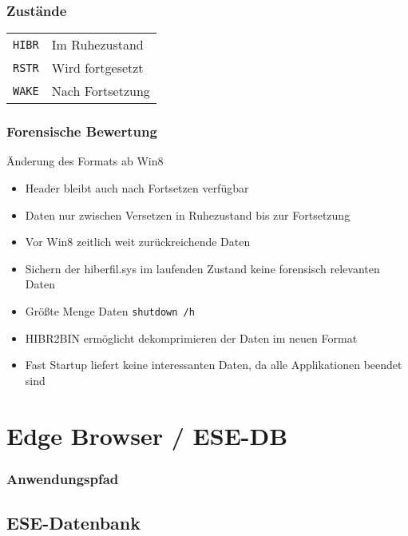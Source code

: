 \begin{multicols}{3}
\subsubsection{Zustände}
\begin{tabular}{@{}p{\the\MyLen}%
		@{}p{\linewidth-\the\MyLen}@{}}
	\texttt{HIBR} & Im Ruhezustand\\
	\texttt{RSTR} & Wird fortgesetzt\\
	\texttt{WAKE} & Nach Fortsetzung\\
\end{tabular}

\subsubsection{Forensische Bewertung}
Änderung des Formats ab Win8
\begin{itemize}[leftmargin=*]
	\item Header bleibt auch nach Fortsetzen verfügbar
	\item Daten nur zwischen Versetzen in Ruhezustand bis zur Fortsetzung
	\item Vor Win8 zeitlich weit zurückreichende Daten
	\item Sichern der hiberfil.sys im laufenden Zustand keine forensisch relevanten Daten
	\item Größte Menge Daten \texttt{shutdown /h}
	\item HIBR2BIN ermöglicht dekomprimieren der Daten im neuen Format
	\item Fast Startup liefert keine interessanten Daten, da alle Applikationen beendet sind
\end{itemize}

\section{Edge Browser / ESE-DB}

\subsubsection{Anwendungspfad}

\subsection{ESE-Datenbank}

\end{multicols}
